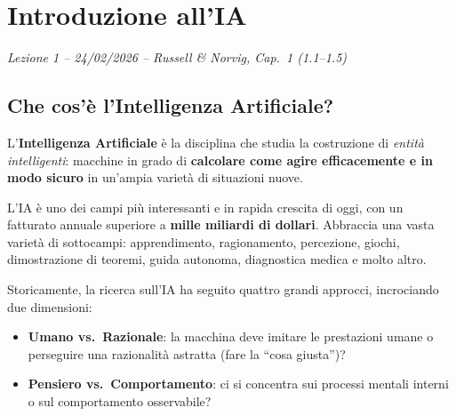 \chapter{Introduzione all'IA}
\begin{flushright}\small\textit{Lezione 1 -- 24/02/2026 -- Russell \& Norvig, Cap.\ 1 (1.1--1.5)}\end{flushright}


\section{Che cos'\`e l'Intelligenza Artificiale?}
\begin{defbox}[Definizione]
L'\textbf{Intelligenza Artificiale} \`e la disciplina che studia la costruzione di \emph{entit\`a intelligenti}: macchine in grado di \textbf{calcolare come agire efficacemente e in modo sicuro} in un'ampia variet\`a di situazioni nuove.
\end{defbox}

L'IA \`e uno dei campi pi\`u interessanti e in rapida crescita di oggi, con un fatturato annuale superiore a \textbf{mille miliardi di dollari}. Abbraccia una vasta variet\`a di sottocampi: apprendimento, ragionamento, percezione, giochi, dimostrazione di teoremi, guida autonoma, diagnostica medica e molto altro.

Storicamente, la ricerca sull'IA ha seguito quattro grandi approcci, incrociando due dimensioni:
\begin{itemize}
    \item \textbf{Umano vs.\ Razionale}: la macchina deve imitare le prestazioni umane o perseguire una razionalit\`a astratta (fare la ``cosa giusta'')?
    \item \textbf{Pensiero vs.\ Comportamento}: ci si concentra sui processi mentali interni o sul comportamento osservabile?
\end{itemize}

